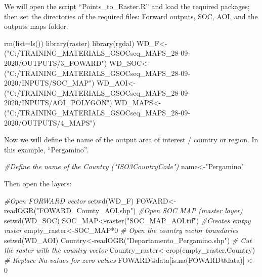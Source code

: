 \documentclass[
  10pt,
  b5paper,
]{book}
\newenvironment{Shaded}{\begin{snugshade}}{\end{snugshade}}
\newcommand{\AttributeTok}[1]{\textcolor[rgb]{0.77,0.63,0.00}{#1}}
\newcommand{\CommentTok}[1]{\textcolor[rgb]{0.56,0.35,0.01}{\textit{#1}}}
\newcommand{\DecValTok}[1]{\textcolor[rgb]{0.00,0.00,0.81}{#1}}
\newcommand{\FunctionTok}[1]{\textcolor[rgb]{0.00,0.00,0.00}{#1}}
\newcommand{\NormalTok}[1]{#1}
\newcommand{\OtherTok}[1]{\textcolor[rgb]{0.56,0.35,0.01}{#1}}
\newcommand{\SpecialCharTok}[1]{\textcolor[rgb]{0.00,0.00,0.00}{#1}}
\newcommand{\StringTok}[1]{\textcolor[rgb]{0.31,0.60,0.02}{#1}}
\begin{document}
We will open the script ``Points\_to\_Raster.R'' and load the required packages; then set the directories of the required files: Forward outputs, SOC, AOI, and the outputs maps folder.

\begin{Shaded}
\begin{Highlighting}[]
\FunctionTok{rm}\NormalTok{(}\AttributeTok{list=}\FunctionTok{ls}\NormalTok{()) }
\FunctionTok{library}\NormalTok{(raster)}
\FunctionTok{library}\NormalTok{(rgdal)}
\NormalTok{WD\_F}\OtherTok{\textless{}{-}}\NormalTok{(}\StringTok{"C:/TRAINING\_MATERIALS\_GSOCseq\_MAPS\_28{-}09{-}2020/OUTPUTS/3\_FOWARD"}\NormalTok{)}
\NormalTok{WD\_SOC}\OtherTok{\textless{}{-}}\NormalTok{(}\StringTok{"C:/TRAINING\_MATERIALS\_GSOCseq\_MAPS\_28{-}09{-}2020/INPUTS/SOC\_MAP"}\NormalTok{)}
\NormalTok{WD\_AOI}\OtherTok{\textless{}{-}}\NormalTok{(}\StringTok{"C:/TRAINING\_MATERIALS\_GSOCseq\_MAPS\_28{-}09{-}2020/INPUTS/AOI\_POLYGON"}\NormalTok{)}
\NormalTok{WD\_MAPS}\OtherTok{\textless{}{-}}\NormalTok{(}\StringTok{"C:/TRAINING\_MATERIALS\_GSOCseq\_MAPS\_28{-}09{-}2020/OUTPUTS/4\_MAPS"}\NormalTok{)}
\end{Highlighting}
\end{Shaded}

Now we will define the name of the output area of interest / country or region. In this example, ``Pergamino''.

\begin{Shaded}
\begin{Highlighting}[]
\CommentTok{\#Define the name of the Country ("ISO3CountryCode")}
\NormalTok{name}\OtherTok{\textless{}{-}}\StringTok{"Pergamino"} 
\end{Highlighting}
\end{Shaded}

Then open the layers:

\begin{Shaded}
\begin{Highlighting}[]
\CommentTok{\#Open FORWARD vector}
\FunctionTok{setwd}\NormalTok{(WD\_F)}
\NormalTok{FOWARD}\OtherTok{\textless{}{-}}\FunctionTok{readOGR}\NormalTok{(}\StringTok{"FOWARD\_County\_AOI.shp"}\NormalTok{)}
\CommentTok{\#Open SOC MAP (master layer)}
\FunctionTok{setwd}\NormalTok{(WD\_SOC)}
\NormalTok{SOC\_MAP}\OtherTok{\textless{}{-}}\FunctionTok{raster}\NormalTok{(}\StringTok{"SOC\_MAP\_AOI.tif"}\NormalTok{)}
\CommentTok{\#Creates emtpy raster }
\NormalTok{empty\_raster}\OtherTok{\textless{}{-}}\NormalTok{SOC\_MAP}\SpecialCharTok{*}\DecValTok{0}
\CommentTok{\# Open the country vector boundaries}
\FunctionTok{setwd}\NormalTok{(WD\_AOI)}
\NormalTok{Country}\OtherTok{\textless{}{-}}\FunctionTok{readOGR}\NormalTok{(}\StringTok{"Departamento\_Pergamino.shp"}\NormalTok{)}
\CommentTok{\# Cut the raster with the country vector}
\NormalTok{Country\_raster}\OtherTok{\textless{}{-}}\FunctionTok{crop}\NormalTok{(empty\_raster,Country)}
\CommentTok{\# Replace Na values for zero values}
\NormalTok{FOWARD}\SpecialCharTok{@}\NormalTok{data[}\FunctionTok{is.na}\NormalTok{(FOWARD}\SpecialCharTok{@}\NormalTok{data)] }\OtherTok{\textless{}{-}} \DecValTok{0}
\end{Highlighting}
\end{Shaded}
\end{document}
